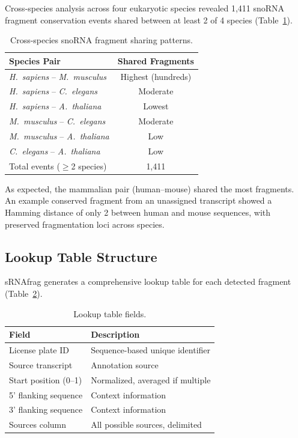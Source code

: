 \documentclass[11pt]{article}
\begin{document}
Cross-species analysis across four eukaryotic species revealed 1,411 snoRNA fragment conservation events shared between at least 2 of 4 species (Table~\ref{tab:conservation}).

\begin{table}[ht]
\centering
\caption{Cross-species snoRNA fragment sharing patterns.}
\label{tab:conservation}
\begin{tabular}{@{}lc@{}}
\toprule
Species Pair & Shared Fragments \\
\midrule
\emph{H.\ sapiens} -- \emph{M.\ musculus} & Highest (hundreds) \\
\emph{H.\ sapiens} -- \emph{C.\ elegans} & Moderate \\
\emph{H.\ sapiens} -- \emph{A.\ thaliana} & Lowest \\
\emph{M.\ musculus} -- \emph{C.\ elegans} & Moderate \\
\emph{M.\ musculus} -- \emph{A.\ thaliana} & Low \\
\emph{C.\ elegans} -- \emph{A.\ thaliana} & Low \\
\midrule
Total events ($\geq$2 species) & 1,411 \\
\bottomrule
\end{tabular}
\end{table}

As expected, the mammalian pair (human--mouse) shared the most fragments.  An example conserved fragment from an unassigned transcript showed a Hamming distance of only 2 between human and mouse sequences, with preserved fragmentation loci across species.

\subsection{Lookup Table Structure}

sRNAfrag generates a comprehensive lookup table for each detected fragment (Table~\ref{tab:lookup}).

\begin{table}[ht]
\centering
\caption{Lookup table fields.}
\label{tab:lookup}
\begin{tabular}{@{}ll@{}}
\toprule
Field & Description \\
\midrule
License plate ID & Sequence-based unique identifier \\
Source transcript & Annotation source \\
Start position (0--1) & Normalized, averaged if multiple \\
5' flanking sequence & Context information \\
3' flanking sequence & Context information \\
Sources column & All possible sources, delimited \\
\bottomrule
\end{tabular}
\end{table}
\end{document}
